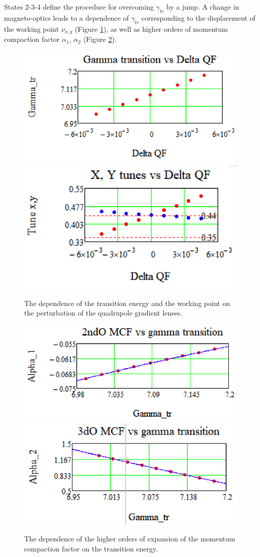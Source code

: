 \documentclass[
aps,%
12pt,%
final,%
notitlepage,%
oneside,%
onecolumn,%
nobibnotes,%
nofootinbib,%
superscriptaddress,%
noshowpacs,%
centertags]%
{revtex4}
\begin{document}
\par States 2-3-4 define the procedure for overcoming $\gamma_{tr}$ by a jump. A change in magneto-optics leads to a dependence of $\gamma_{tr}$ corresponding to the displacement of the working point $\nu_{x,y}$ (Figure \ref{fig:tran}), as well as higher orders of momentum compaction factor $\alpha_1$, $\alpha_2$ (Figure \ref{fig:alpha}).

\begin{figure}[!h]
\setcaptionmargin{5mm}
   \includegraphics*[width=.49\columnwidth]{img/fig_02-1}
   \includegraphics*[width=.49\columnwidth]{img/fig_02-2}
\caption{The dependence of the transition energy and the working point on the perturbation of the quadrupole gradient lenses.}
\label{fig:tran}
\end{figure}

\begin{figure}[!h]
\setcaptionmargin{5mm}
   \includegraphics*[width=.49\columnwidth]{img/fig_03-1}
   \includegraphics*[width=.49\columnwidth]{img/fig_03-2}
\caption{The dependence of the higher orders of expansion of the momentum compaction factor on the transition energy.}
\label{fig:alpha}
\end{figure}
\end{document}
